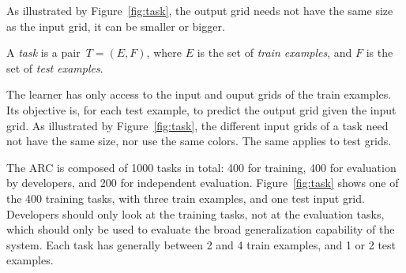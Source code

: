 \documentclass[a4paper]{llncs}
\newcommand{\HIDE}[1]{}
\begin{document}
As illustrated by Figure~\ref{fig:task}, the output grid needs not
have the same size as the input grid, it can be smaller or bigger.

\begin{definition}[task]
  A {\em task} is a pair~$T = (E,F)$, where $E$ is the set of {\em
    train examples}, and $F$ is the set of {\em test examples}.
\end{definition}

The learner has only access to the input and ouput grids of the
train examples. Its objective is, for each test example, to predict
the output grid given the input grid.
%
As illustrated by Figure~\ref{fig:task}, the different input grids of
a task need not have the same size, nor use the same colors. The same
applies to test grids.

The ARC is composed of 1000 tasks in total: 400 for training, 400 for
evaluation by developers, and 200 for independent
evaluation. Figure~\ref{fig:task} shows one of the 400 training tasks,
with three train examples, and one test input grid. Developers should
only look at the training tasks, not at the evaluation tasks, which
should only be used to evaluate the broad generalization capability of
the system.
%
Each task has generally between 2 and 4 train examples, and 1 or 2
test examples.

\HIDE{
\section{Related Work}
\label{related}

This work is related to three domains, all part of the field of
Artificial Intelligence: {\em structured prediction} (as a sub-domain
of machine learning), {\em programming by example}, and the {\em
  Minimum Description Length (MDL)} principle.

{\em Structure prediction} is the sub-domain of supervised machine
learning where the outputs to predict are structured objects rather
than scalar values (discrete or
numeric)~\cite{ReviewStructPred,dietterich2008structured}. The output
grids of the ARC challenge are an example. Other common and recent
examples are found in natural language processing (NLP) and generative
media. Examples in NLP are parsing (predicting a parse
tree)~\cite{PredParseTree} or machine translation (predicting a word
sequence)~\cite{MachTransl}. Examples in generative media often use
generative adversarial networks (GAN) to generate photo-realistic
images, music songs or texts~\cite{GAN_App}. However, the previous
examples are not part of supervised machine learning because there is
not one (or a few) correct answer, the generated output ``only'' has
to be realistic to human perception. Structured prediction appears to
be mostly applied to sequences. Indeed, predicting a sequence of
symbols can be decomposed into repeatedly predicting the next
symbol. We could not find work predicting grid structures similar to
ARC grids.


Programming by example, ILP, ...

MDL work...
}%
\end{document}
